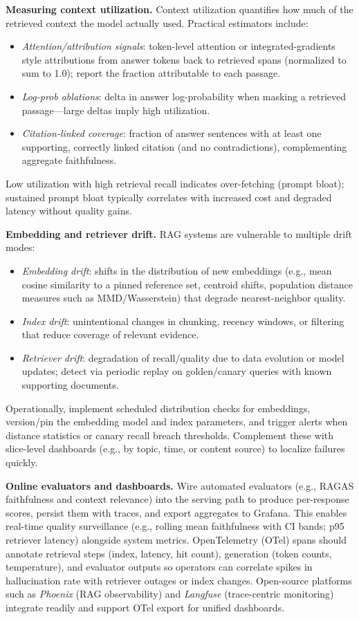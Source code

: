 \medskip
\noindent\textbf{Measuring context utilization.}
Context utilization quantifies how much of the retrieved context the model actually used. Practical estimators include:
\begin{itemize}
    \item \emph{Attention/attribution signals}: token-level attention or integrated-gradients style attributions from answer tokens back to retrieved spans (normalized to sum to 1.0); report the fraction attributable to each passage.
    \item \emph{Log-prob ablations}: delta in answer log-probability when masking a retrieved passage—large deltas imply high utilization.
    \item \emph{Citation-linked coverage}: fraction of answer sentences with at least one supporting, correctly linked citation (and no contradictions), complementing aggregate faithfulness.
\end{itemize}
Low utilization with high retrieval recall indicates over-fetching (prompt bloat); sustained prompt bloat typically correlates with increased cost and degraded latency without quality gains.

\medskip
\noindent\textbf{Embedding and retriever drift.}
RAG systems are vulnerable to multiple drift modes:
\begin{itemize}
    \item \emph{Embedding drift}: shifts in the distribution of new embeddings (e.g., mean cosine similarity to a pinned reference set, centroid shifts, population distance measures such as MMD/Wasserstein) that degrade nearest-neighbor quality.
    \item \emph{Index drift}: unintentional changes in chunking, recency windows, or filtering that reduce coverage of relevant evidence.
    \item \emph{Retriever drift}: degradation of recall/quality due to data evolution or model updates; detect via periodic replay on golden/canary queries with known supporting documents.
\end{itemize}
Operationally, implement scheduled distribution checks for embeddings, version/pin the embedding model and index parameters, and trigger alerts when distance statistics or canary recall breach thresholds. Complement these with slice-level dashboards (e.g., by topic, time, or content source) to localize failures quickly.

\medskip
\noindent\textbf{Online evaluators and dashboards.}
Wire automated evaluators (e.g., RAGAS faithfulness and context relevance) into the serving path to produce per-response scores, persist them with traces, and export aggregates to Grafana. This enables real-time quality surveillance (e.g., rolling mean faithfulness with CI bands; p95 retriever latency) alongside system metrics. OpenTelemetry (OTel) spans should annotate retrieval steps (index, latency, hit count), generation (token counts, temperature), and evaluator outputs so operators can correlate spikes in hallucination rate with retriever outages or index changes. Open-source platforms such as \emph{Phoenix} (RAG observability) and \emph{Langfuse} (trace-centric monitoring) integrate readily and support OTel export for unified dashboards.

